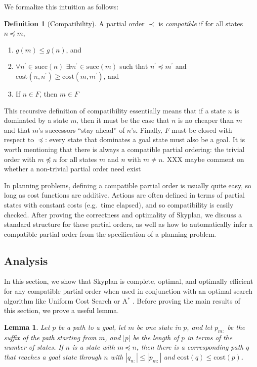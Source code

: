 \documentclass[letterpaper]{article}
\theoremstyle{plain} \newtheorem{theorem}{Theorem} \newtheorem{proposition}{Proposition} \newtheorem{lemma}{Lemma}
\theoremstyle{definition} \newtheorem{definition}{Definition} \newtheorem{conjecture}{Conjecture} \newtheorem*{example}{Example}
\theoremstyle{remark} \newtheorem*{remark}{Remark} \newtheorem*{note}{Note} \newtheorem{case}{Case}
\newcommand{\Astar}{A$^*$ }
\begin{document}
We formalize this intuition as follows:
\begin{definition}[Compatibility]
	\label{def-compatibility}
  A partial order $\prec$ is \textit{compatible} if for all states $n \preceq m$,
  \begin{enumerate}
    \item $g(m) \le g(n)$, and 
    \item $\forall n^\prime \in \mathrm{succ}(n)$ $\exists m^\prime \in
      \mathrm{succ}(m)$ such that $n^\prime \preceq m^\prime$ and
      $\mathrm{cost}(n,n^\prime) \ge \mathrm{cost}(m, m^\prime)$, and
    \item If $n \in F$, then $m \in F$
  \end{enumerate}
\end{definition}
This recursive definition of compatibility essentially means that
if a state $n$ is dominated by a state $m$, then it must be the
case that $n$ is no cheaper than $m$ and that $m$'s successors
``stay ahead'' of $n$'s. Finally, $F$ must be closed with respect
to $\preceq$: every state that dominates a goal state must also be
a goal. It is worth mentioning that there is always a compatible
partial ordering: the trivial order with $m \npreceq n$ for all
states $m$ and $n$ with $m \ne n$. XXX maybe comment on whether a non-trivial partial
order need exist


In planning problems, defining a compatible partial order is usually
quite easy, so long as cost functions are additive.  Actions are
often defined in terms of partial states with constant costs (e.g.\
time elapsed), and so compatibility is easily checked.  After proving
the correctness and optimality of Skyplan, we discuss a standard
structure for these partial orders, as well as how to automatically
infer a compatible partial order from the specification of a planning problem.

\subsection{Analysis}

In this section, we show that Skyplan is complete, optimal, and
optimally efficient for any compatible partial order when used in
conjunction with an optimal search algorithm like Uniform Cost
Search or \Astar. Before proving the main results of this section,
we prove a useful lemma.

\begin{lemma}{}\label{clm-complete-lemma}
  Let $p$ be a path to a goal, let $m$ be one state in $p$, and let 
$p_{m:}$ be the suffix of the path starting from $m$, and $|p|$
be
the length of $p$ in terms of the number of states. If $n$ is a state
with $m \preceq n$, then there is a corresponding path $q$ that reaches a goal state
through $n$ with $|q_{n:}| \leq |p_{m:}|$ and $\mathrm{cost}(q) \leq \mathrm{cost}(p)$.
\end{lemma}
\end{document}
